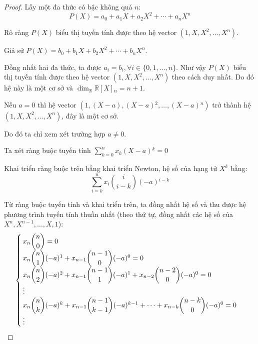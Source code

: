 \documentclass[class=linear-algebra,crop=false]{standalone}
\begin{document}
\begin{proof}Lấy một đa thức có bậc không quá $n$:
    \[ P(X) = a_{0} + a_{1}X + a_{2}X^{2} + \cdots + a_{n}X^{n} \]
    \par Rõ ràng $P(X)$ biểu thị tuyến tính được theo hệ vector $(1, X, X^{2}, \ldots, X^{n})$.
    \par Giả sử $P(X) = b_{0} + b_{1}X + b_{2}X^{2} + \cdots + b_{n}X^{n}$.
    \par Đồng nhất hai đa thức, ta được $a_{i} = b_{i}, \forall i\in\{0, 1, \ldots, n\}$. Như vậy $P(X)$ biểu thị tuyến tính được theo hệ vector $(1, X, X^{2}, \ldots, X^{n})$ theo cách duy nhất. Do đó hệ này là một cơ sở và $\dim_{\mathbb{R}}\mathbb{R}[X]{}_{n} = n + 1$.

    \par Nếu $a = 0$ thì hệ vector $(1, (X - a), (X - a){}^{2}, \ldots, (X - a){}^{n})$ trở thành hệ $(1, X, X^{2}, \ldots, X^{n})$, đây là một cơ sở.
    \par Do đó ta chỉ xem xét trường hợp $a\ne 0$.
    \par Ta xét ràng buộc tuyến tính $\displaystyle\sum^{n}_{k=0}x_{k}(X-a){}^{k} = 0$
    \par Khai triển ràng buộc trên bằng khai triển Newton, hệ số của hạng tử $X^{k}$ bằng:
    \[ \sum^{n}_{i=k}x_{i}\binom{i}{i-k}(-a){}^{i-k} \]
    \par Từ ràng buộc tuyến tính và khai triển trên, ta đồng nhất hệ số và thu được hệ phương trình tuyến tính thuần nhất (theo thứ tự, đồng nhất các hệ số của $X^{n}, X^{n-1}, \ldots, X, 1$):
    \[
        \begin{cases}
            x_{n}\dbinom{n}{0} = 0                                                                                              \\
            x_{n}\dbinom{n}{1}(-a){}^{1} + x_{n-1}\dbinom{n-1}{0}(-a){}^{0} = 0                                                 \\
            x_{n}\dbinom{n}{2}(-a){}^{2} + x_{n-1}\dbinom{n-1}{1}(-a){}^{1} + x_{n-2}\dbinom{n-2}{0}(-a){}^{0} = 0              \\
            \vdots                                                                                                              \\
            x_{n}\dbinom{n}{k}(-a){}^{k} + x_{n-1}\dbinom{n-1}{k-1}(-a){}^{k-1} + \cdots + x_{n-k}\dbinom{n-k}{0}(-a){}^{0} = 0 \\
            \vdots                                                                                                              \\

\end{cases}\]
\end{proof}
\end{document}
